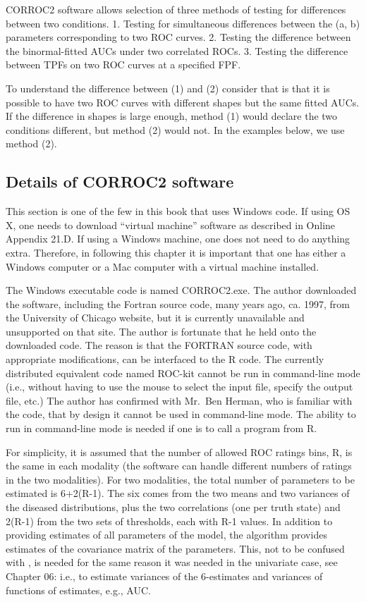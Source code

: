\documentclass[
]{book}
\begin{document}
CORROC2 software allows selection of three methods of testing for differences between two conditions.
1. Testing for simultaneous differences between the (a, b) parameters corresponding to two ROC curves.
2. Testing the difference between the binormal-fitted AUCs under two correlated ROCs.
3. Testing the difference between TPFs on two ROC curves at a specified FPF.

To understand the difference between (1) and (2) consider that is that it is possible to have two ROC curves with different shapes but the same fitted AUCs. If the difference in shapes is large enough, method (1) would declare the two conditions different, but method (2) would not. In the examples below, we use method (2).

\hypertarget{bivariate-binormal-model-corroc2-details}{%
\subsection{Details of CORROC2 software}\label{bivariate-binormal-model-corroc2-details}}

This section is one of the few in this book that uses Windows code. If using OS X, one needs to download ``virtual machine'' software as described in Online Appendix 21.D. If using a Windows machine, one does not need to do anything extra. Therefore, in following this chapter it is important that one has either a Windows computer or a Mac computer with a virtual machine installed.

The Windows executable code is named CORROC2.exe. The author downloaded the software, including the Fortran source code, many years ago, ca. 1997, from the University of Chicago website, but it is currently unavailable and unsupported on that site. The author is fortunate that he held onto the downloaded code. The reason is that the FORTRAN source code, with appropriate modifications, can be interfaced to the R code. The currently distributed equivalent code named ROC-kit cannot be run in command-line mode (i.e., without having to use the mouse to select the input file, specify the output file, etc.) The author has confirmed with Mr.~Ben Herman, who is familiar with the code, that by design it cannot be used in command-line mode. The ability to run in command-line mode is needed if one is to call a program from R.

For simplicity, it is assumed that the number of allowed ROC ratings bins, R, is the same in each modality (the software can handle different numbers of ratings in the two modalities). For two modalities, the total number of parameters to be estimated is 6+2(R-1). The six comes from the two means and two variances of the diseased distributions, plus the two correlations (one per truth state) and 2(R-1) from the two sets of thresholds, each with R-1 values. In addition to providing estimates of all parameters of the model, the algorithm provides estimates of the covariance matrix of the parameters. This, not to be confused with , is needed for the same reason it was needed in the univariate case, see Chapter 06: i.e., to estimate variances of the 6-estimates and variances of functions of estimates, e.g., AUC.
\end{document}
